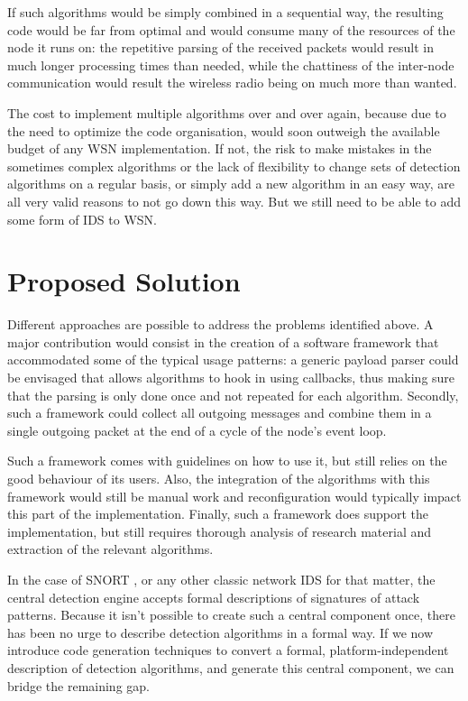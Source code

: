 \documentclass[conference]{IEEEtran}
\begin{document}
If such algorithms would be simply combined in a sequential way, the resulting
code would be far from optimal and would consume many of the resources of the
node it runs on: the repetitive parsing of the received packets would result in
much longer processing times than needed, while the chattiness of the
inter-node communication would result the wireless radio being on much more
than wanted.

The cost to implement multiple algorithms over and over again, because due to
the need to optimize the code organisation, would soon outweigh the available
budget of any WSN implementation. If not, the risk to make mistakes in the
sometimes complex algorithms or the lack of flexibility to change sets of
detection algorithms on a regular basis, or simply add a new algorithm in an
easy way, are all very valid reasons to not go down this way. But we still need
to be able to add some form of IDS to WSN.

\section{Proposed Solution}
\label{section:solution}

Different approaches are possible to address the problems identified above. A
major contribution would consist in the creation of a software framework that
accommodated some of the typical usage patterns: a generic payload parser could
be envisaged that allows algorithms to hook in using callbacks, thus making
sure that the parsing is only done once and not repeated for each algorithm.
Secondly, such a framework could collect all outgoing messages and combine them
in a single outgoing packet at the end of a cycle of the node's event loop.

Such a framework comes with guidelines on how to use it, but still relies on
the good behaviour of its users. Also, the integration of the algorithms with
this framework would still be manual work and reconfiguration would typically
impact this part of the implementation. Finally, such a framework does support
the implementation, but still requires thorough analysis of research material
and extraction of the relevant algorithms.

In the case of SNORT \cite{roesch1999snort}, or any other classic network IDS
for that matter, the central detection engine accepts formal descriptions of
signatures of attack patterns. Because it isn't possible to create such a
central component once, there has been no urge to describe detection algorithms
in a formal way. If we now introduce code generation techniques to convert a
formal, platform-independent description of detection algorithms, and generate
this central component, we can bridge the remaining gap.
\end{document}
